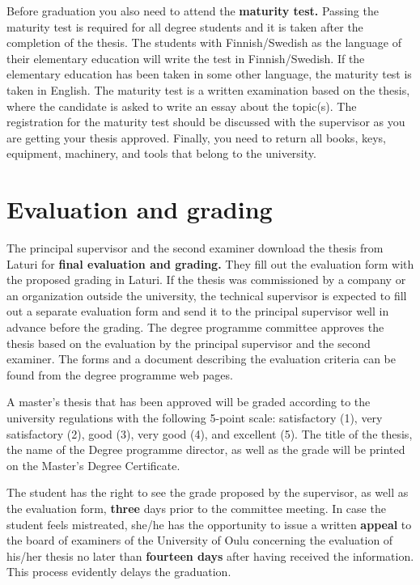 Before graduation you also need to attend the \textbf{maturity test.} Passing the maturity test is required for all degree students and it is taken after the completion of the thesis. The students with Finnish/Swedish as the language of their elementary education will write the test in Finnish/Swedish. If the elementary education has been taken in some other language, the maturity test is taken in English. The maturity test is a written examination based on the thesis, where the candidate is asked to write an essay about the topic(s). The registration for the maturity test should be discussed with the supervisor as you are getting your thesis approved. Finally, you need to return all books, keys, equipment, machinery, and tools that belong to the university.

\section{Evaluation and grading}

The principal supervisor and the second examiner download the thesis from Laturi for \textbf{final evaluation and grading.} They fill out the evaluation form with the proposed grading in Laturi. If the thesis was commissioned by a company or an organization outside the university, the technical supervisor is expected to fill out a separate evaluation form and send it to the principal supervisor well in advance before the grading. The degree programme committee approves the thesis based on the evaluation by the principal supervisor and the second examiner. The forms and a document describing the evaluation criteria can be found from the degree programme web pages\DIFaddbegin \DIFadd{~}\DIFaddend \cite{mscstudies}.

A master’s thesis that has been approved will be graded according to the university regulations with the following 5-point scale: satisfactory (1), very satisfactory (2), good (3), very good (4), and excellent (5). The title of the thesis, the name of the Degree programme director, as well as the grade will be printed on the Master’s Degree Certificate.

The student has the right to see the grade proposed by the supervisor, as well as the evaluation form, \textbf{three} days prior to the committee meeting. In case the student feels mistreated, she/he has the opportunity to issue a written \textbf{appeal} to the board of examiners of the University of Oulu concerning the evaluation of his/her thesis no later than \textbf{fourteen days} after having received the information. This process evidently delays the graduation.

